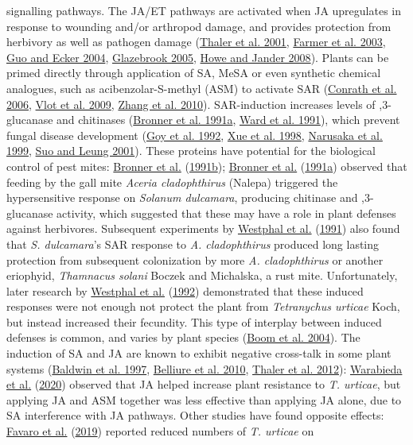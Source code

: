 \documentclass[12pt,final,CPage]{ufthesis}
\begin{document}
{signalling pathways. The JA/ET pathways are activated when JA upregulates in response to wounding and/or arthropod damage, and provides protection from herbivory as well as pathogen damage (\protect\hyperlink{ref-Thaler2001}{Thaler et al. 2001}, \protect\hyperlink{ref-Farmer2003}{Farmer et al. 2003}, \protect\hyperlink{ref-Guo2004}{Guo and Ecker 2004}, \protect\hyperlink{ref-Glazebrook2005}{Glazebrook 2005}, \protect\hyperlink{ref-Howe2008}{Howe and Jander 2008}). Plants can be primed directly through application of SA, MeSA or even synthetic chemical analogues, such as acibenzolar-S-methyl (ASM) to activate SAR (\protect\hyperlink{ref-Conrath2006}{Conrath et al. 2006}, \protect\hyperlink{ref-Vlot2009}{Vlot et al. 2009}, \protect\hyperlink{ref-Zhang2010}{Zhang et al. 2010}). SAR-induction increases levels of ,3-glucanase and chitinases (\protect\hyperlink{ref-Bronner1991a}{Bronner et al. 1991a}, \protect\hyperlink{ref-Ward1991a}{Ward et al. 1991}), which prevent fungal disease development (\protect\hyperlink{ref-Goy1992}{Goy et al. 1992}, \protect\hyperlink{ref-Xue1998}{Xue et al. 1998}, \protect\hyperlink{ref-Narusaka1999}{Narusaka et al. 1999}, \protect\hyperlink{ref-Suo2001}{Suo and Leung 2001}). These proteins have potential for the biological control of pest mites: \protect\hyperlink{ref-Bronner1991}{Bronner et al.} (\protect\hyperlink{ref-Bronner1991}{1991b}); \protect\hyperlink{ref-Bronner1991a}{Bronner et al.} (\protect\hyperlink{ref-Bronner1991a}{1991a}) observed that feeding by the gall mite \emph{Aceria cladophthirus} (Nalepa) triggered the hypersensitive response on \emph{Solanum dulcamara}, producing chitinase and ,3-glucanase activity, which suggested that these may have a role in plant defenses against herbivores. Subsequent experiments by \protect\hyperlink{ref-Westphal1991}{Westphal et al.} (\protect\hyperlink{ref-Westphal1991}{1991}) also found that \emph{S. dulcamara}'s SAR response to \emph{A. cladophthirus} produced long lasting protection from subsequent colonization by more \emph{A. cladophthirus} or another eriophyid, \emph{Thamnacus solani} Boczek and Michalska, a rust mite. Unfortunately, later research by \protect\hyperlink{ref-Westphal1992}{Westphal et al.} (\protect\hyperlink{ref-Westphal1992}{1992}) demonstrated that these induced responses were not enough not protect the plant from \emph{Tetranychus urticae} Koch, but instead increased their fecundity. This type of interplay between induced defenses is common, and varies by plant species (\protect\hyperlink{ref-Boom2004}{Boom et al. 2004}). The induction of SA and JA are known to exhibit negative cross-talk in some plant systems (\protect\hyperlink{ref-Baldwin1997}{Baldwin et al. 1997}, \protect\hyperlink{ref-Belliure2010}{Belliure et al. 2010}, \protect\hyperlink{ref-Thaler2012}{Thaler et al. 2012}): \protect\hyperlink{ref-Warabieda2020}{Warabieda et al.} (\protect\hyperlink{ref-Warabieda2020}{2020}) observed that JA helped increase plant resistance to \emph{T. urticae}, but applying JA and ASM together was less effective than applying JA alone, due to SA interference with JA pathways. Other studies have found opposite effects: \protect\hyperlink{ref-Favaro2019}{Favaro et al.} (\protect\hyperlink{ref-Favaro2019}{2019}) reported reduced numbers of \emph{T. urticae} on }
\end{document}
